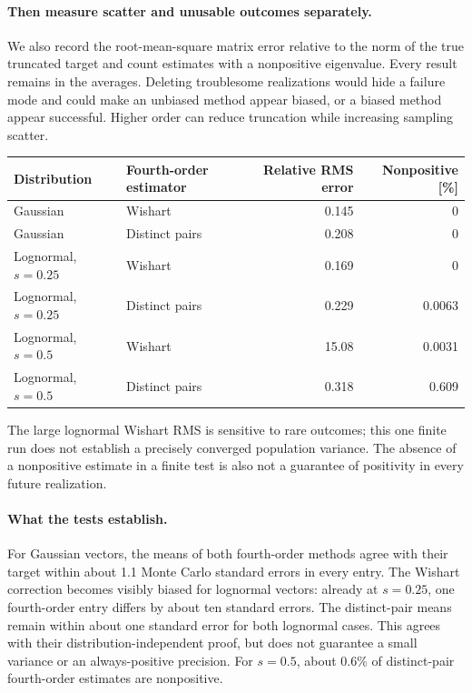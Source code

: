 \documentclass[11pt]{article}
\begin{document}
\paragraph{Then measure scatter and unusable outcomes separately.}
We also record the root-mean-square matrix error relative to the norm of the
true truncated target and count estimates with a nonpositive eigenvalue.
Every result remains in the averages. Deleting troublesome realizations
would hide a failure mode and could make an unbiased method appear biased,
or a biased method appear successful. Higher order can reduce truncation
while increasing sampling scatter.

\begin{center}
\begin{tabular}{llrr}
\toprule
Distribution & Fourth-order estimator & Relative RMS error & Nonpositive [\%]\\
\midrule
Gaussian & Wishart & 0.145 & 0\\
Gaussian & Distinct pairs & 0.208 & 0\\
Lognormal, $s=0.25$ & Wishart & 0.169 & 0\\
Lognormal, $s=0.25$ & Distinct pairs & 0.229 & 0.0063\\
Lognormal, $s=0.5$ & Wishart & 15.08 & 0.0031\\
Lognormal, $s=0.5$ & Distinct pairs & 0.318 & 0.609\\
\bottomrule
\end{tabular}
\end{center}
The large lognormal Wishart RMS is sensitive to rare outcomes; this one
finite run does not establish a precisely converged population variance.
The absence of a nonpositive estimate in a finite test is also not a
guarantee of positivity in every future realization.

\paragraph{What the tests establish.}
For Gaussian vectors, the means of both fourth-order methods agree with
their target within about 1.1 Monte Carlo standard errors in every entry.
The Wishart correction becomes visibly biased for lognormal vectors:
already at $s=0.25$, one fourth-order entry differs by about ten standard
errors. The distinct-pair means remain within about one standard error for
both lognormal cases. This agrees with their distribution-independent proof,
but does not guarantee a small variance or an always-positive precision.
For $s=0.5$, about 0.6\% of distinct-pair fourth-order estimates are nonpositive.
\end{document}
